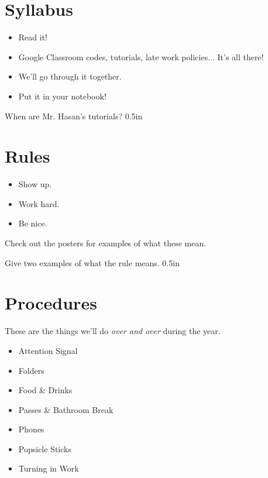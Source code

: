 \section{Syllabus}
\vspace{-0.5\onelineskip}
\begin{itemize}[nosep]
    \item{Read it!}
    \item Google Classroom codes, tutorials, late work policies... It's all there!
    \item We'll go through it together.
    \item{Put it in your notebook!}
\end{itemize}

{
    When are Mr. Hasan's tutorials?
}
{0.5in}



\section{Rules}
\vspace{-0.5\onelineskip}
\begin{itemize}[nosep]
    \item{Show up.}
    \item Work hard.
    \item Be nice.
\end{itemize}

Check out the posters for examples of what these mean.

{
    Give two examples of what the rule  means.
}
{0.5in}



\section{Procedures}
These are the things we'll do {\itshape over and over} during the year.
\vspace{-0.5\onelineskip}
\begin{itemize}[nosep]
    \item{Attention Signal}
    \item Folders
    \item Food \& Drinks
    \item Passes \& Bathroom Break 
    \item Phones 
    \item Popsicle Sticks
    \item Turning in Work
\end{itemize}

